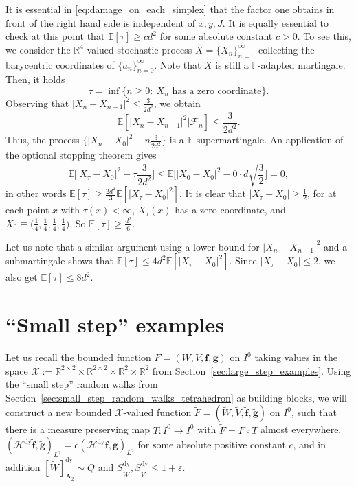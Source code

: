 \documentclass{amsart}
\newcommand{\R}{\mathbb{R}}
\newcommand{\cF}{\mathcal{F}}
\newcommand{\wt}{\widetilde}
\theoremstyle{definition}
\theoremstyle{remark}
\begin{document}
It is essential in \eqref{eq:damage_on_each_simplex} that the factor one obtains in front of the right hand side is independent of $x,y,J$. It is equally essential to check at this point that $\mathbb{E}[\tau]\geq cd^2$ for some absolute constant $c>0$. To see this, we consider the $\R^4$-valued stochastic process $X=\{X_{n}\}_{n=0}^{\infty}$ collecting the barycentric coordinates of $\{\wt{a}_n\}^{\infty}_{n=0}$. Note that $X$ is still a $\mathbb{F}$-adapted martingale. Then, it holds
\begin{equation*}
    \tau=\inf\{n\geq0:~X_n\text{ has a zero coordinate}\}.
\end{equation*}
Observing that $|X_n-X_{n-1}|^2\leq\frac{3}{2d^2}$, we obtain
\begin{equation*}
    \mathbb{E}[|X_n-X_{n-1}|^2|\cF_n]\leq\frac{3}{2d^2}.
\end{equation*}
Thus, the process $\bigg\{|X_n-X_0|^2-n\frac{3}{2d^2}\bigg\}$ is a $\mathbb{F}$-supermartingale. An application of the optional stopping theorem gives
\begin{equation*}
    \mathbb{E}\bigg[|X_{\tau}-X_0|^2-\tau\frac{3}{2d^2}\bigg]\leq \mathbb{E}\bigg[|X_{0}-X_0|^2-0\cdot d\sqrt{\frac{3}{2}}\bigg]=0,
\end{equation*}
in other words $\mathbb{E}[\tau]\geq\frac{2d^2}{3}\mathbb{E}[|X_{\tau}-X_0|^2]$. It is clear that $|X_{\tau}-X_{0}|\geq\frac{1}{2}$, for at each point $x$ with $\tau(x)<\infty$, $X_{\tau}(x)$ has a zero coordinate, and $X_{0}\equiv\bigg(\frac{1}{4},\frac{1}{4},\frac{1}{4},\frac{1}{4}\bigg)$. So $\mathbb{E}[\tau]\geq\frac{d^2}{6}$.

Let us note that a similar argument using a lower bound for $|X_n-X_{n-1}|^2$ and a submartingale shows that $\mathbb{E}[\tau]\leq 4d^2\mathbb{E}[|X_{\tau}-X_0|^2]$. Since $|X_{\tau}-X_{0}|\leq 2$, we also get $\mathbb{E}[\tau]\leq 8d^2$.

\section{``Small step'' examples}
\label{sec:small_step_examples}

Let us recall the bounded function $F=(W,V,\mathbf{f},\mathbf{g})$ on $I^{0}$ taking values in the space $\mathscr{X}:=\R^{2\times 2}\times\R^{2\times 2}\times\R^2\times\R^2$ from Section~\ref{sec:large_step_examples}. Using the ``small step'' random walks from Section~\ref{sec:small_step_random_walks_tetrahedron} as building blocks, we will construct a new bounded $\mathscr{X}$-valued function $\wt{F}=(\wt{W},\wt{V},\wt{\mathbf{f}},\wt{\mathbf{g}})$ on $I^{0}$, such that there is a measure preserving map $T:I^0\to I^0$ with $\wt{F}=F\circ T$ almost everywhere, $(\mathcal{H}^{\mathrm{dy}}\wt{\mathbf{f}},\wt{\mathbf{g}})_{L^2}=c(\mathcal{H}^{\mathrm{dy}}\mathbf{f},\mathbf{g})_{L^2}$ for some absolute positive constant $c$, and in addition $[\wt{W}]^{\mathrm{dy}}_{\mathbf{A}_2}\sim Q$ and $S^{\mathrm{dy}}_{\wt{W}},S^{\mathrm{dy}}_{\wt{V}}\leq 1+\varepsilon$.
\end{document}
